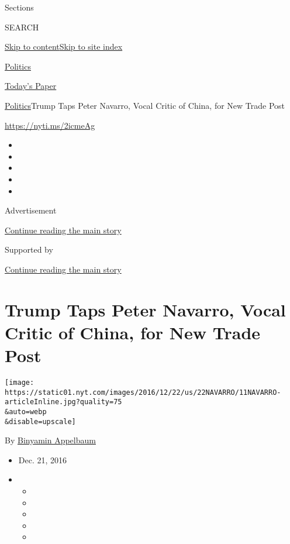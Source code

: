 Sections

SEARCH

\protect\hyperlink{site-content}{Skip to
content}\protect\hyperlink{site-index}{Skip to site index}

\href{https://www.nytimes.com/section/politics}{Politics}

\href{https://myaccount.nytimes.com/auth/login?response_type=cookie\&client_id=vi}{}

\href{https://www.nytimes.com/section/todayspaper}{Today's Paper}

\href{/section/politics}{Politics}\textbar{}Trump Taps Peter Navarro,
Vocal Critic of China, for New Trade Post

\url{https://nyti.ms/2icmeAg}

\begin{itemize}
\item
\item
\item
\item
\item
\end{itemize}

Advertisement

\protect\hyperlink{after-top}{Continue reading the main story}

Supported by

\protect\hyperlink{after-sponsor}{Continue reading the main story}

\hypertarget{trump-taps-peter-navarro-vocal-critic-of-china-for-new-trade-post}{%
\section{Trump Taps Peter Navarro, Vocal Critic of China, for New Trade
Post}\label{trump-taps-peter-navarro-vocal-critic-of-china-for-new-trade-post}}

\texttt{[image: https://static01.nyt.com/images/2016/12/22/us/22NAVARRO/11NAVARRO-articleInline.jpg?quality=75\\\&auto=webp\\\&disable=upscale]}

By \href{http://www.nytimes.com/by/binyamin-appelbaum}{Binyamin
Appelbaum}

\begin{itemize}
\item
  Dec. 21, 2016
\item
  \begin{itemize}
  \item
  \item
  \item
  \item
  \item
  \end{itemize}
\end{itemize}

